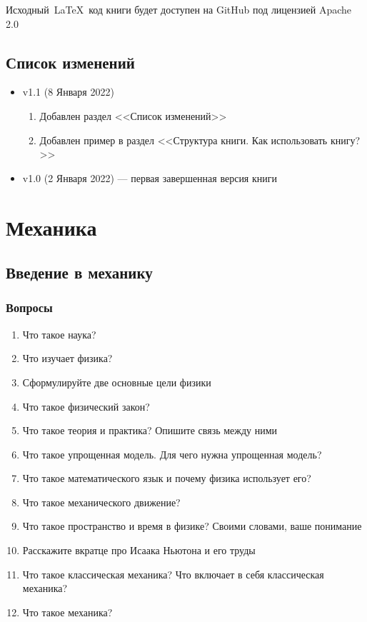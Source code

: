 \documentclass[12pt,a4paper]{report}
\begin{document}
Исходный~\LaTeX~код книги будет доступен на GitHub под лицензией Apache 2.0

\chapter*{Список изменений}
\begin{itemize}
    \item v1.1 (8 Января 2022)
        \begin{enumerate}
        \item Добавлен раздел <<Список изменений>>
        \item Добавлен пример в раздел <<Структура книги. Как использовать книгу?>>
        \end{enumerate}
    \item v1.0 (2 Января 2022) --- первая завершенная версия книги 

\end{itemize}

\part{Механика}
\setcounter{chapter}{-1}

\chapter{Введение в механику}
\section{Вопросы}
\begin{enumerate} 
\item Что такое наука? 
\item Что изучает физика? 
\item Сформулируйте две основные цели физики
\item Что такое физический закон? 
\item Что такое теория и практика? Опишите связь между ними
\item Что такое упрощенная модель. Для чего нужна упрощенная модель? 
\item Что такое математического язык и почему физика использует его?
\item Что такое механического движение?
\item Что такое пространство и время в физике? Своими словами, ваше понимание
\item Расскажите вкратце про Исаака Ньютона и его труды
\item Что такое классическая механика? Что включает в себя классическая механика?
\item Что такое механика?
\end{enumerate}
\end{document}

